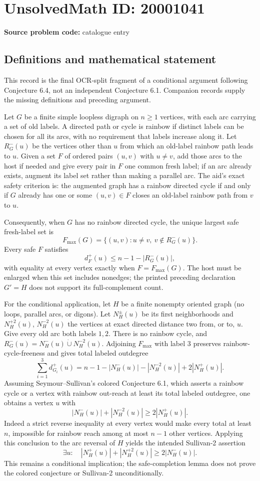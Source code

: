 \documentclass[11pt]{article}
\begin{document}
\section*{UnsolvedMath ID: 20001041}
\textbf{Source problem code:} catalogue entry
\subsection{Definitions and mathematical statement}
This record is the final OCR-split fragment of a conditional argument following Conjecture 6.4, not an independent Conjecture 6.1. Companion records supply the missing definitions and preceding argument.

Let $G$ be a finite simple loopless digraph on $n\geq1$ vertices, with each arc carrying a set of old labels. A directed path or cycle is rainbow if distinct labels can be chosen for all its arcs, with no requirement that labels increase along it. Let $R_G^-(u)$ be the vertices other than $u$ from which an old-label rainbow path leads to $u$. Given a set $F$ of ordered pairs $(u,v)$ with $u\ne v$, add those arcs to the host if needed and give every pair in $F$ one common fresh label; if an arc already exists, augment its label set rather than making a parallel arc. The aid's exact safety criterion is: the augmented graph has a rainbow directed cycle if and only if $G$ already has one or some $(u,v)\in F$ closes an old-label rainbow path from $v$ to $u$.

Consequently, when $G$ has no rainbow directed cycle, the unique largest safe fresh-label set is
\[
 F_{\max}(G)=\{(u,v):u\ne v,\ v\notin R_G^-(u)\}.
\]
Every safe $F$ satisfies
\[
 d_F^+(u)\leq n-1-|R_G^-(u)|,
\]
with equality at every vertex exactly when $F=F_{\max}(G)$. The host must be enlarged when this set includes nonedges; the printed preceding declaration $G'=H$ does not support its full-complement count.

For the conditional application, let $H$ be a finite nonempty oriented graph (no loops, parallel arcs, or digons). Let $N_H^\pm(u)$ be its first neighborhoods and $N_H^{+2}(u)$, $N_H^{-2}(u)$ the vertices at exact directed distance two from, or to, $u$. Give every old arc both labels $1,2$. There is no rainbow cycle, and
$R_G^-(u)=N_H^-(u)\mathbin{\dot\cup}N_H^{-2}(u)$.
Adjoining $F_{\max}$ with label $3$ preserves rainbow-cycle-freeness and gives total labeled outdegree
\[
 \sum_{i=1}^3d_{G_i}^+(u)
 =n-1-|N_H^-(u)|-|N_H^{-2}(u)|+2|N_H^+(u)|.
\]
Assuming Seymour--Sullivan's colored Conjecture 6.1, which asserts a rainbow cycle or a vertex with rainbow out-reach at least its total labeled outdegree, one obtains a vertex $u$ with
\[
 |N_H^-(u)|+|N_H^{-2}(u)|\geq2|N_H^+(u)|.
\]
Indeed a strict reverse inequality at every vertex would make every total at least $n$, impossible for rainbow reach among at most $n-1$ other vertices. Applying this conclusion to the arc reversal of $H$ yields the intended Sullivan-2 assertion
\[
 \exists u:\quad |N_H^+(u)|+|N_H^{+2}(u)|\geq2|N_H^-(u)|.
\]
This remains a conditional implication; the safe-completion lemma does not prove the colored conjecture or Sullivan-2 unconditionally.
\end{document}
